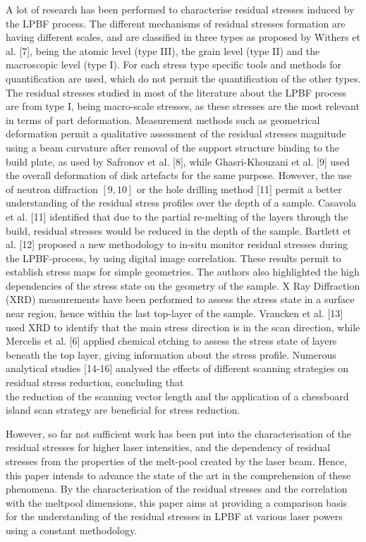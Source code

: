 \documentclass[10pt]{article}
\begin{document}
A lot of research has been performed to characterise residual stresses induced by the LPBF process. The different mechanisms of residual stresses formation are having different scales, and are classified in three types as proposed by Withers et al. [7], being the atomic level (type III), the grain level (type II) and the macroscopic level (type I). For each stress type specific tools and methods for quantification are used, which do not permit the quantification of the other types. The residual stresses studied in most of the literature about the LPBF process are from type I, being macro-scale stresses, as these stresses are the most relevant in terms of part deformation. Measurement methods such as geometrical deformation permit a qualitative assessment of the residual stresses magnitude using a beam curvature after removal of the support structure binding to the build plate, as used by Safronov et al. [8], while Ghasri-Khouzani et al. [9] used the overall deformation of disk artefacts for the same purpose. However, the use of neutron diffraction $[9,10]$ or the hole drilling method [11] permit a better understanding of the residual stress profiles over the depth of a sample. Casavola et al. [11] identified that due to the partial re-melting of the layers through the build, residual stresses would be reduced in the depth of the sample. Bartlett et al. [12] proposed a new methodology to in-situ monitor residual stresses during the LPBF-process, by using digital image correlation. These results permit to establish stress maps for simple geometries. The authors also highlighted the high dependencies of the stress state on the geometry of the sample. X Ray Diffraction (XRD) measurements have been performed to assess the stress state in a surface near region, hence within the last top-layer of the sample. Vrancken et al. [13] used XRD to identify that the main stress direction is in the scan direction, while Mercelis et al. [6] applied chemical etching to assess the stress state of layers beneath the top layer, giving information about the stress profile. Numerous analytical studies [14-16] analysed the effects of different scanning strategies on residual stress reduction, concluding that\\
the reduction of the scanning vector length and the application of a chessboard island scan strategy are beneficial for stress reduction.

However, so far not sufficient work has been put into the characterisation of the residual stresses for higher laser intensities, and the dependency of residual stresses from the properties of the melt-pool created by the laser beam. Hence, this paper intends to advance the state of the art in the comprehension of these phenomena. By the characterisation of the residual stresses and the correlation with the meltpool dimensions, this paper aims at providing a comparison basis for the understanding of the residual stresses in LPBF at various laser powers using a constant methodology.
\end{document}
